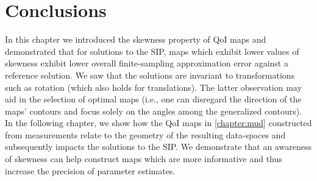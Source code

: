 
% 

% 
%
% 

\section{Conclusions}
In this chapter we introduced the skewness property of QoI maps and demonstrated that for solutions to the SIP, maps which exhibit lower values of skewness exhibit lower overall finite-sampling approximation error against a reference solution.
We saw that the solutions are invariant to transformations such as rotation (which also holds for translations).
The latter observation may aid in the selection of optimal maps (i.e., one can disregard the direction of the maps' contours and focus solely on the angles among the generalized contours).
In the following chapter, we show how the QoI maps in \ref{chapter:mud} constructed from measurements relate to the geometry of the resulting data-spaces and subsequently impacts the solutions to the SIP.
We demonstrate that an awareness of skewness can help construct maps which are more informative and thus increase the precision of parameter estimates.
\FloatBarrier
